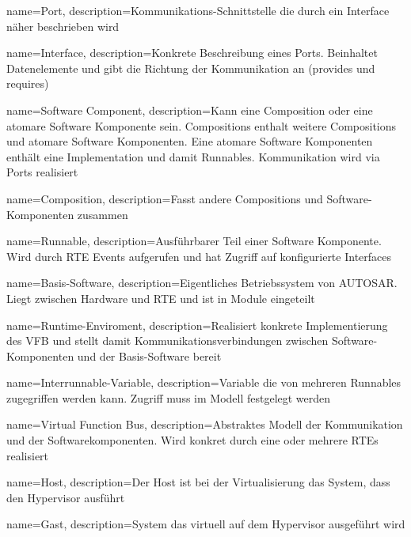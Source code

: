  {
   name=Port,
   description={Kommunikations-Schnittstelle die durch ein Interface näher beschrieben wird}
}

 {
   name=Interface,
   description={Konkrete Beschreibung eines Ports. Beinhaltet Datenelemente und gibt die Richtung der Kommunikation an (provides und requires)}
}

 {
   name=Software Component,
   description={Kann eine Composition oder eine atomare Software Komponente sein. Compositions enthalt weitere Compositions und atomare Software Komponenten. Eine atomare Software Komponenten enthält eine Implementation und damit Runnables. Kommunikation wird via Ports realisiert}
}

 {
   name=Composition,
   description={Fasst andere Compositions und Software-Komponenten zusammen}
}

 {
   name=Runnable,
   description={Ausführbarer Teil einer Software Komponente. Wird durch RTE Events aufgerufen und hat Zugriff auf konfigurierte Interfaces}
}

 {
   name=Basis-Software,
   description={Eigentliches Betriebssystem von AUTOSAR. Liegt zwischen Hardware und RTE und ist in Module eingeteilt}
}

 {
   name=Runtime-Enviroment,
   description={Realisiert konkrete Implementierung des VFB und stellt damit Kommunikationsverbindungen zwischen Software-Komponenten und der Basis-Software bereit}
}

 {
   name=Interrunnable-Variable,
   description={Variable die von mehreren Runnables zugegriffen werden kann. Zugriff muss im Modell festgelegt werden}
}

 {
   name=Virtual Function Bus,
   description={Abstraktes Modell der Kommunikation und der Softwarekomponenten. Wird konkret durch eine oder mehrere RTEs realisiert}
}

 {
   name=Host,
   description={Der Host ist bei der Virtualisierung das System, dass den Hypervisor ausführt}
}

 {
   name=Gast,
   description={System das virtuell auf dem Hypervisor ausgeführt wird}
}
